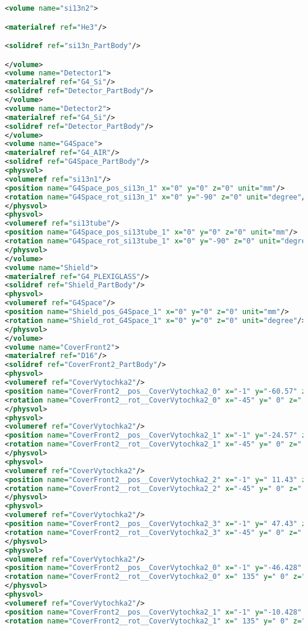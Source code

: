 \begin{lstlisting}[language=XML, firstline=1, lastline=89]
<volume name="si13n2">

<materialref ref="He3"/>

<solidref ref="si13n_PartBody"/>

</volume>
<volume name="Detector1">
<materialref ref="G4_Si"/>
<solidref ref="Detector_PartBody"/>
</volume>
<volume name="Detector2">
<materialref ref="G4_Si"/>
<solidref ref="Detector_PartBody"/>
</volume>
<volume name="G4Space">
<materialref ref="G4_AIR"/>
<solidref ref="G4Space_PartBody"/>
<physvol>
<volumeref ref="si13n1"/>
<position name="G4Space_pos_si13n_1" x="0" y="0" z="0" unit="mm"/>
<rotation name="G4Space_rot_si13n_1" x="0" y="-90" z="0" unit="degree"/>
</physvol>
<physvol>
<volumeref ref="si13tube"/>
<position name="G4Space_pos_si13tube_1" x="0" y="0" z="0" unit="mm"/>
<rotation name="G4Space_rot_si13tube_1" x="0" y="-90" z="0" unit="degree"/>
</physvol>
</volume>
<volume name="Shield">
<materialref ref="G4_PLEXIGLASS"/>
<solidref ref="Shield_PartBody"/>
<physvol>
<volumeref ref="G4Space"/>
<position name="Shield_pos_G4Space_1" x="0" y="0" z="0" unit="mm"/>
<rotation name="Shield_rot_G4Space_1" x="0" y="0" z="0" unit="degree"/>
</physvol>
</volume>
<volume name="CoverFront2">
<materialref ref="D16"/>
<solidref ref="CoverFront2_PartBody"/>
<physvol>
<volumeref ref="CoverVytochka2"/>
<position name="CoverFront2__pos__CoverVytochka2_0" x="-1" y="-60.57" z=" 24" unit="mm"/>
<rotation name="CoverFront2__rot__CoverVytochka2_0" x="-45" y=" 0" z=" 0" unit="deg"/>
</physvol>
<physvol>
<volumeref ref="CoverVytochka2"/>
<position name="CoverFront2__pos__CoverVytochka2_1" x="-1" y="-24.57" z=" 24" unit="mm"/>
<rotation name="CoverFront2__rot__CoverVytochka2_1" x="-45" y=" 0" z=" 0" unit="deg"/>
</physvol>
<physvol>
<volumeref ref="CoverVytochka2"/>
<position name="CoverFront2__pos__CoverVytochka2_2" x="-1" y=" 11.43" z=" 24" unit="mm"/>
<rotation name="CoverFront2__rot__CoverVytochka2_2" x="-45" y=" 0" z=" 0" unit="deg"/>
</physvol>
<physvol>
<volumeref ref="CoverVytochka2"/>
<position name="CoverFront2__pos__CoverVytochka2_3" x="-1" y=" 47.43" z=" 24" unit="mm"/>
<rotation name="CoverFront2__rot__CoverVytochka2_3" x="-45" y=" 0" z=" 0" unit="deg"/>
</physvol>
<physvol>
<volumeref ref="CoverVytochka2"/>
<position name="CoverFront2__pos__CoverVytochka2_0" x="-1" y="-46.428" z=" 8.858" unit="mm"/>
<rotation name="CoverFront2__rot__CoverVytochka2_0" x=" 135" y=" 0" z=" 0" unit="deg"/>
</physvol>
<physvol>
<volumeref ref="CoverVytochka2"/>
<position name="CoverFront2__pos__CoverVytochka2_1" x="-1" y="-10.428" z=" 8.858" unit="mm"/>
<rotation name="CoverFront2__rot__CoverVytochka2_1" x=" 135" y=" 0" z=" 0" unit="deg"/>

\end{lstlisting}
